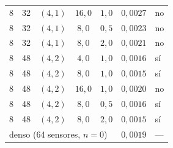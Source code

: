 \begin{tabular}{crcccc l}
$8$ & 32 & $(4, 1)$ & $16{,}0$ & $1{,}0$ & $0{,}0027$ & no \\
$8$ & 32 & $(4, 1)$ & $8{,}0$ & $0{,}5$ & $0{,}0023$ & no \\
$8$ & 32 & $(4, 1)$ & $8{,}0$ & $2{,}0$ & $0{,}0021$ & no \\
$8$ & 48 & $(4, 2)$ & $4{,}0$ & $1{,}0$ & $0{,}0016$ & sí \\
$8$ & 48 & $(4, 2)$ & $8{,}0$ & $1{,}0$ & $0{,}0015$ & sí \\
$8$ & 48 & $(4, 2)$ & $16{,}0$ & $1{,}0$ & $0{,}0020$ & no \\
$8$ & 48 & $(4, 2)$ & $8{,}0$ & $0{,}5$ & $0{,}0016$ & sí \\
$8$ & 48 & $(4, 2)$ & $8{,}0$ & $2{,}0$ & $0{,}0015$ & sí \\
\midrule
\multicolumn{5}{l}{denso (64 sensores, $n = 0$)} & $0{,}0019$ & --- \\
\bottomrule
\end{tabular}
